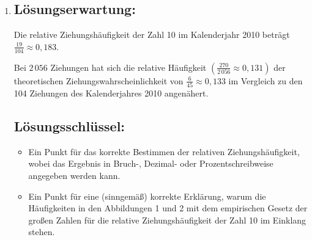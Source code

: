 \begin{langesbeispiel}
{\begin{enumerate}
	\subsubsection{Richtigstellung:}
	\begin{itemize}
		\item  Eine Zahl, die bei einer Lottoziehung gezogen wurde, wird bei der darauffolgenden Lottoziehung mit einer Wahrscheinlichkeit von $\frac{6}{45}$ erneut gezogen.
		\item Im Kalenderjahr 2010 war die Wahrscheinlichkeit, die Zahl 8 zu ziehen, bei jeder Ziehung gleich $\frac{6}{45}$.
		\item Die Wahrscheinlichkeit, dass die Zahl 32 bei einer Ziehung als zweite Zahl gezogen wird, beträgt $\frac{1}{45}$.
	\end{itemize}
	 	
	\subsection{Lösungsschlüssel:}
	\begin{itemize}
		\item  Ein Ausgleichspunkt ist nur dann zu geben, wenn genau zwei Aussagen angekreuzt sind und beide Kreuze richtig gesetzt sind.
		\item Ein Punkt für eine (sinngemäß) korrekte Richtigstellung einer der drei falschen Aussagen.
	\end{itemize}
	
	\item \subsection{Lösungserwartung:}
			
		Die relative Ziehungshäufigkeit der Zahl 10 im Kalenderjahr 2010 beträgt $\frac{19}{104}\approx 0,183$.
		
		Bei $2\,056$ Ziehungen hat sich die relative Häufigkeit $\left(\frac{270}{2\,056}\approx 0,131\right)$ der theoretischen Ziehungswahrscheinlichkeit von $\frac{6}{45}\approx 0,133$ im Vergleich zu den 104 Ziehungen des Kalenderjahres 2010 angenähert.
		
	\subsection{Lösungsschlüssel:}
	
\begin{itemize}
	\item  Ein Punkt für das korrekte Bestimmen der relativen Ziehungshäufigkeit, wobei das Ergebnis in Bruch-, Dezimal- oder Prozentschreibweise angegeben werden kann.
	\item  Ein Punkt für eine (sinngemäß) korrekte Erklärung, warum die Häufigkeiten in den Abbildungen 1 und 2 mit dem empirischen Gesetz der großen Zahlen für die relative Ziehungshäufigkeit der Zahl 10 im Einklang stehen.
\end{itemize}


\end{enumerate}}
\end{langesbeispiel}
